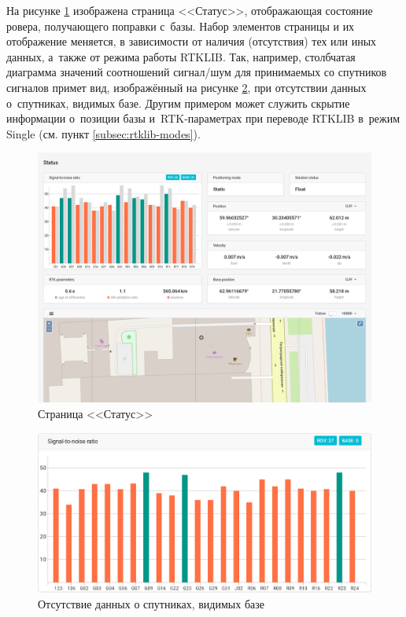 На рисунке \ref{fig:status-detailed} изображена страница <<Статус>>, отображающая состояние ровера, получающего поправки с~базы. Набор элементов страницы и их отображение меняется, в зависимости от наличия (отсутствия) тех или иных данных, а~также от режима работы RTKLIB. Так, например, столбчатая диаграмма значений соотношений сигнал/шум для принимаемых со спутников сигналов примет вид, изображённый на рисунке \ref{fig:status-snr-rover}, при отсутствии данных о~спутниках, видимых базе. Другим примером может служить скрытие информации о~позиции базы и~RTK-параметрах при переводе RTKLIB в~режим Single (см. пункт \ref{subsec:rtklib-modes}).

\begin{figure}[h!]
  \centering
  \setlength{\fboxsep}{5pt}
  \includegraphics[width=.9\textwidth]{img/reachview/status_content_laptop}
  \vspace*{6pt}
  \caption{Страница <<Статус>>}
  \label{fig:status-detailed}
\end{figure}

\begin{figure}[h!]
  \centering
  \setlength{\fboxsep}{5pt}
  \includegraphics[width=.9\textwidth]{img/reachview/status_snr_rover}
  \vspace*{6pt}
  \caption{Отсутствие данных о спутниках, видимых базе}
  \label{fig:status-snr-rover}
\end{figure}

